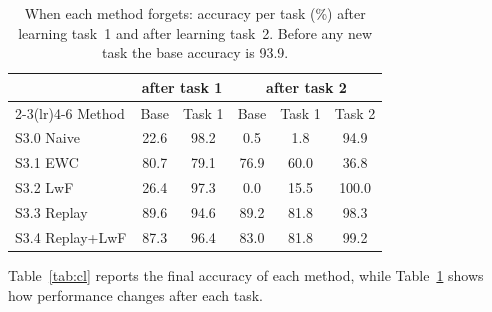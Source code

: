 \documentclass[conference]{IEEEtran}
\begin{document}
\begin{table}[t]
\centering
\caption{When each method forgets: accuracy per task (\%) after learning task~1 and after
learning task~2. Before any new task the base accuracy is 93.9.}
\label{tab:cltime}
\renewcommand{\arraystretch}{1.1}
\setlength{\tabcolsep}{4.5pt}
\begin{tabular}{lccccc}
\toprule
 & \multicolumn{2}{c}{after task 1} & \multicolumn{3}{c}{after task 2} \\
\cmidrule(lr){2-3}\cmidrule(lr){4-6}
Method & Base & Task 1 & Base & Task 1 & Task 2 \\
\midrule
S3.0 Naive       & 22.6 & 98.2 & 0.5  & 1.8  & 94.9 \\
S3.1 EWC         & 80.7 & 79.1 & 76.9 & 60.0 & 36.8 \\
S3.2 LwF         & 26.4 & 97.3 & 0.0  & 15.5 & 100.0 \\
S3.3 Replay      & 89.6 & 94.6 & 89.2 & 81.8 & 98.3 \\
S3.4 Replay+LwF  & 87.3 & 96.4 & 83.0 & 81.8 & 99.2 \\
\bottomrule
\end{tabular}
\end{table}

Table~\ref{tab:cl} reports the final accuracy of each method, while
Table~\ref{tab:cltime} shows how performance changes after each task.
\end{document}
